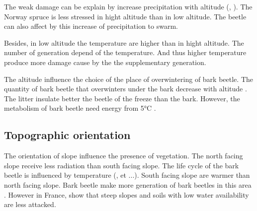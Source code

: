 \documentclass[3p,procedia]{elsarticle}
\begin{document}
The weak damage can be explain by increase precipitation with altitude (\cite{kotlarski_elevation_2012}, \cite{Roe_orographic_preicpitation_2005}).
The Norway spruce is less stressed in hight altitude than in low altitude. 
The beetle can also affect by this increase of precipitation to swarm. 

Besides, in low altitude the temperature are higher than in hight altitude. 
The number of generation depend of the temperature.
And thus higher temperature produce more damage cause by the the supplementary generation. 

The altitude influence the choice of the place of overwintering of  bark beetle.
The quantity of bark beetle that overwinters under the bark decrease with altitude \citep{kasumovic_overwintering_2019}.
The litter insulate better the beetle of the freeze \citep{lombardero_cold_2000} than the bark.
However, the metabolism of bark beetle need energy from 5°C  \citep{kostal_physiological_2011}.





	


\subsection{Topographic orientation}


The orientation of slope influence the presence of vegetation. The north facing slope receive less radiation than south facing slope. 
The life cycle of the bark beetle is influenced by temperature (\cite{baier_phenipscomprehensive_2007}, et ...). South facing slope are warmer than north facing slope.
Bark beetle make more generation of bark beetles in this area \cite{}. 
However in France, \cite{nardi_drought_2022} show that steep slopes and soils with low water availability are less attacked. 
\end{document}
